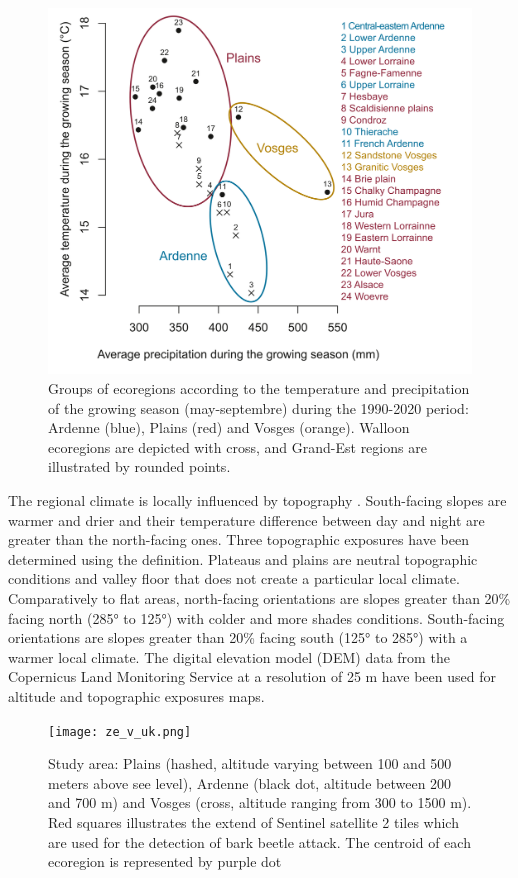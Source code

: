 \documentclass[3p,procedia]{elsarticle}
\begin{document}
\begin{figure}[htbp] 
	\centering
	\includegraphics[width=0.8\linewidth]{climat/climat_region.png}
	\caption{Groups of ecoregions according to the temperature and precipitation of the growing season (may-septembre) during the 1990-2020 period: Ardenne (blue), Plains (red) and Vosges (orange). Walloon ecoregions are depicted with cross, and Grand-Est regions are illustrated by rounded points.}
	\label{fig:clim}
\end{figure}

The regional climate is locally influenced by topography \citep{de_frenne_forest_2021}.
South-facing slopes are warmer and drier and their temperature difference between day and night are greater than the north-facing ones.
Three topographic exposures have been determined using the \cite{Delvaux_galoux} definition.
Plateaus and plains are neutral topographic conditions and valley floor that does not create a particular local climate.
Comparatively to flat areas, north-facing orientations are slopes greater than  20\% facing north (285° to 125°) with colder and more shades conditions.
South-facing orientations are slopes greater than  20\% facing south (125° to 285°) with a warmer local climate.
The digital elevation model (DEM) data from the Copernicus Land Monitoring Service \citep{DEM_copernicus} at a resolution of 25 m have been used for altitude and topographic exposures maps.

\begin{figure} [htbp] 
	\centering
	\texttt{[image: ze\_v\_uk.png]}
	\caption{Study area: Plains (hashed, altitude varying between 100 and 500 meters above see level), Ardenne (black dot, altitude between 200 and 700 m) and Vosges (cross, altitude ranging from 300 to 1500 m). Red squares illustrates the extend of Sentinel satellite 2 tiles which are used for the detection of bark beetle attack. The centroid of each ecoregion is represented by purple dot}
	\label{fig:situ}
\end{figure}
\end{document}
